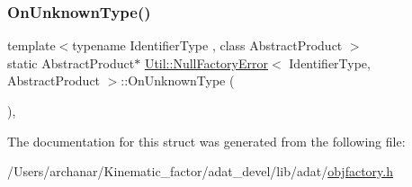 \mbox{\label{structUtil_1_1NullFactoryError_a237b7bcb3c07a5337eec26c8d9f40e1b}} 
\subsubsection{\texorpdfstring{OnUnknownType()}{OnUnknownType()}\hspace{0.1cm}{\footnotesize\ttfamily [2/2]}}
{\footnotesize\ttfamily template$<$typename Identifier\+Type , class Abstract\+Product $>$ \\
static Abstract\+Product$\ast$ \mbox{\hyperlink{structUtil_1_1NullFactoryError}{Util\+::\+Null\+Factory\+Error}}$<$ Identifier\+Type, Abstract\+Product $>$\+::On\+Unknown\+Type (\begin{DoxyParamCaption}\item[{const Identifier\+Type \&}]{ }\end{DoxyParamCaption})\hspace{0.3cm}{\ttfamily [inline]}, {\ttfamily [static]}}



The documentation for this struct was generated from the following file\+:\begin{DoxyCompactItemize}
\item 
/\+Users/archanar/\+Kinematic\+\_\+factor/adat\+\_\+devel/lib/adat/\mbox{\hyperlink{lib_2adat_2objfactory_8h}{objfactory.\+h}}\end{DoxyCompactItemize}
